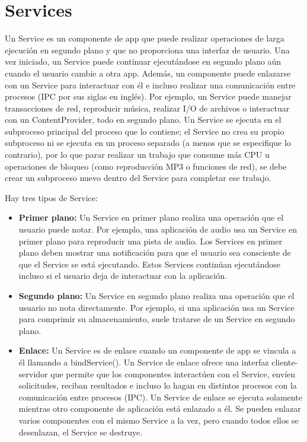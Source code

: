 \section{Services}
Un Service es un componente de app que puede realizar operaciones de larga ejecución en segundo plano y que no proporciona una interfaz de usuario. Una vez iniciado, un Service puede continuar ejecutándose en segundo plano aún cuando el usuario cambie a otra app. Además, un componente puede enlazarse con un Service para interactuar con él e incluso realizar una comunicación entre procesos (IPC por sus siglas en inglés). Por ejemplo, un Service puede manejar transacciones de red, reproducir música, realizar I/O de archivos o interactuar con un ContentProvider, todo en segundo plano.
Un Service se ejecuta en el subproceso principal del proceso que lo contiene; el Service no crea su propio subproceso ni se ejecuta en un proceso separado (a menos que se especifique lo contrario), por lo que parar realizar un trabajo que consume más CPU u operaciones de bloqueo (como reproducción MP3 o funciones de red), se debe crear un subproceso nuevo dentro del Service para completar ese trabajo.

Hay tres tipos de Service:

\begin{itemize}
	\item \textbf{Primer plano:} Un Service en primer plano realiza una operación que el usuario puede notar. Por ejemplo, una aplicación de audio usa un Service en primer plano para reproducir una pista de audio. Los Services en primer plano deben mostrar una notificación para que el usuario sea consciente de que el Service se está ejecutando. Estos Services continúan ejecutándose incluso si el usuario deja de interactuar con la aplicación.
	
	
	\item \textbf{Segundo plano:} Un Service en segundo plano realiza una operación que el usuario no nota directamente. Por ejemplo, si una aplicación usa un Service para comprimir su almacenamiento, suele tratarse de un Service en segundo plano.
	
	
	\item \textbf{Enlace:} Un Service es de enlace cuando un componente de app se vincula a él llamando a bindService(). Un Service de enlace ofrece una interfaz cliente-servidor que permite que los componentes interactúen con el Service, envíen solicitudes, reciban resultados e incluso lo hagan en distintos procesos con la comunicación entre procesos (IPC). Un Service de enlace se ejecuta solamente mientras otro componente de aplicación está enlazado a él. Se pueden enlazar varios componentes con el mismo Service a la vez, pero cuando todos ellos se desenlazan, el Service se destruye.
\cite{androidDocs}		
\end{itemize}




